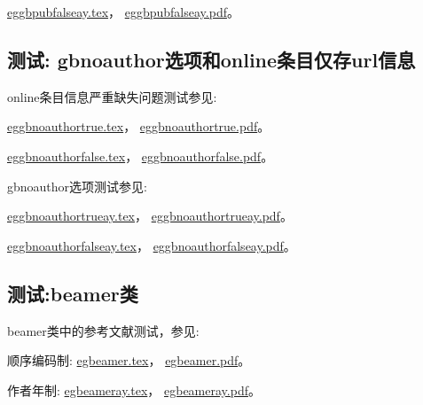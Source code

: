 \href{run:./eggbpubfalseay.tex}{eggbpubfalseay.tex}，
\href{run:./eggbpubfalseay.pdf}{eggbpubfalseay.pdf}。




\subsection{测试: gbnoauthor选项和online条目仅存url信息}\label{sec:opt:noauthor}
online条目信息严重缺失问题测试参见:

\href{run:./eggbnoauthortrue.tex}{eggbnoauthortrue.tex}，
\href{run:./eggbnoauthortrue.pdf}{eggbnoauthortrue.pdf}。

\href{run:./eggbnoauthorfalse.tex}{eggbnoauthorfalse.tex}，
\href{run:./eggbnoauthorfalse.pdf}{eggbnoauthorfalse.pdf}。

gbnoauthor选项测试参见:

\href{run:./eggbnoauthortrueay.tex}{eggbnoauthortrueay.tex}，
\href{run:./eggbnoauthortrueay.pdf}{eggbnoauthortrueay.pdf}。

\href{run:./eggbnoauthorfalseay.tex}{eggbnoauthorfalseay.tex}，
\href{run:./eggbnoauthorfalseay.pdf}{eggbnoauthorfalseay.pdf}。

\subsection{测试:beamer类}

beamer类中的参考文献测试，参见:

顺序编码制:
\href{run:./egbeamer.tex}{egbeamer.tex}，
\href{run:./egbeamer.pdf}{egbeamer.pdf}。

作者年制:
\href{run:./egbeameray.tex}{egbeameray.tex}，
\href{run:./egbeameray.pdf}{egbeameray.pdf}。


